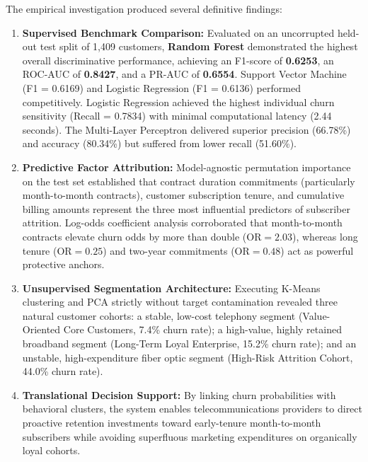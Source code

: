 \documentclass[12pt,a4paper]{report}
\newcommand{\bestModelName}{Random Forest}
\newcommand{\bestModelFOne}{0.6253}
\newcommand{\bestModelRocAuc}{0.8427}
\newcommand{\bestModelPrAuc}{0.6554}
\newcommand{\SupportVectorMachineFOne}{0.6169}
\newcommand{\LogisticRegressionRec}{0.7834}
\newcommand{\LogisticRegressionFOne}{0.6136}
\newcommand{\clusterZeroName}{Value-Oriented Core Customers}
\newcommand{\clusterOneName}{Long-Term Loyal Enterprise}
\newcommand{\clusterTwoName}{High-Risk Attrition Cohort}
\begin{document}
The empirical investigation produced several definitive findings:
\begin{enumerate}
    \item \textbf{Supervised Benchmark Comparison:} Evaluated on an uncorrupted held-out test split of 1,409 customers, \textbf{\bestModelName{}} demonstrated the highest overall discriminative performance, achieving an F1-score of \textbf{\bestModelFOne{}}, an ROC-AUC of \textbf{\bestModelRocAuc{}}, and a PR-AUC of \textbf{\bestModelPrAuc{}}. Support Vector Machine (F1 = \SupportVectorMachineFOne{}) and Logistic Regression (F1 = \LogisticRegressionFOne{}) performed competitively. Logistic Regression achieved the highest individual churn sensitivity (Recall = \LogisticRegressionRec{}) with minimal computational latency (2.44 seconds). The Multi-Layer Perceptron delivered superior precision (66.78\%) and accuracy (80.34\%) but suffered from lower recall (51.60\%).
    \item \textbf{Predictive Factor Attribution:} Model-agnostic permutation importance on the test set established that contract duration commitments (particularly month-to-month contracts), customer subscription tenure, and cumulative billing amounts represent the three most influential predictors of subscriber attrition. Log-odds coefficient analysis corroborated that month-to-month contracts elevate churn odds by more than double ($\text{OR} = 2.03$), whereas long tenure ($\text{OR} = 0.25$) and two-year commitments ($\text{OR} = 0.48$) act as powerful protective anchors.
    \item \textbf{Unsupervised Segmentation Architecture:} Executing K-Means clustering and PCA strictly without target contamination revealed three natural customer cohorts: a stable, low-cost telephony segment (\clusterZeroName{}, 7.4\% churn rate); a high-value, highly retained broadband segment (\clusterOneName{}, 15.2\% churn rate); and an unstable, high-expenditure fiber optic segment (\clusterTwoName{}, 44.0\% churn rate).
    \item \textbf{Translational Decision Support:} By linking churn probabilities with behavioral clusters, the system enables telecommunications providers to direct proactive retention investments toward early-tenure month-to-month subscribers while avoiding superfluous marketing expenditures on organically loyal cohorts.
\end{enumerate}
\end{document}
